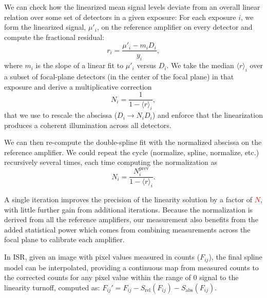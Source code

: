 We can check how the linearized mean signal levels deviate from an overall linear relation over some set of detectors in a given exposure:
For each exposure $i$, we form the linearized signal, $\mu'_i$, on the reference amplifier on every detector and compute the fractional residual:
\begin{equation}
    r_i = \frac{\mu'_i - m_i D_{i}}{y_i},
\end{equation}
where $m_i$ is the slope of a linear fit to $\mu'_i$ versus $D_{i}$.
We take the median $\langle r \rangle_i$ over a subset of focal-plane detectors (in the center of the focal plane) in that exposure and derive a multiplicative correction
\begin{equation}
    N_i = \frac{1}{1 - \langle r \rangle_i},
\end{equation} that we use to rescale the abscissa ($D_{i} \rightarrow N_i D_{i}$) and enforce that the linearization produces a coherent illumination across all detectors.

We can then re-compute the double-spline fit with the normalized abscissa on the reference amplifier. We could repeat the cycle (normalize, spline, normalize, etc.) recursively several times, each time computing the normalization as \begin{equation}
    N_i = \frac{N_i^{\mathrm{prev}}}{1 - \langle r \rangle_i}.
\end{equation}

A single iteration improves the precision of the linearity solution by a factor of \textcolor{red}{$N$}, with little further gain from additional iterations.  Because the normalization is derived from all the reference amplifiers, our measurement also benefits from the added statistical power which comes from combining measurements across the focal plane to calibrate each amplifier. 

In ISR, given an image with pixel values measured in counts ($F_{ij}$), the final spline model can be interpolated, providing a continuous map from measured counts to the corrected counts for any pixel value within the range of 0 signal to the linearity turnoff, computed as:
$F_{ij}' = F_{ij} - S_{\mathrm{rel}}(F_{ij}) - S_{\mathrm{abs}}(F_{ij})$.

